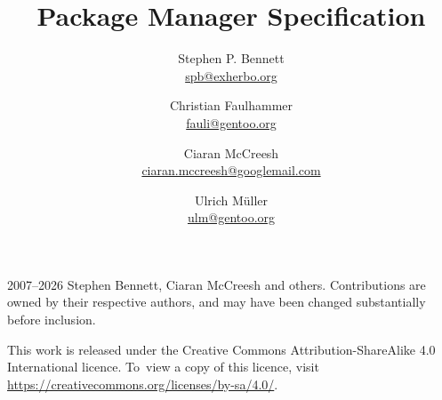 \documentclass{pms}
\title{Package Manager Specification}
\author{%
    Stephen P. Bennett \\
    \href{mailto:spb@exherbo.org}{spb@exherbo.org}
    \and
    Christian Faulhammer \\
    \href{mailto:fauli@gentoo.org}{fauli@gentoo.org}
    \and
    Ciaran McCreesh \\
    \href{mailto:ciaran.mccreesh@googlemail.com}{ciaran.mccreesh@googlemail.com}
    \and
    Ulrich Müller \\
    \href{mailto:ulm@gentoo.org}{ulm@gentoo.org}
}
\begin{document}
\maketitle

\thispagestyle{empty}
\vspace*{\fill}
{%
    \small
    \textcopyright{} 2007--2026 Stephen Bennett, Ciaran McCreesh and others. Contributions are owned
    by their respective authors, and may have been changed substantially before inclusion.

    This work is released under the Creative Commons Attribution-ShareAlike 4.0 International
    licence. To~view a copy of this licence, visit
    \url{https://creativecommons.org/licenses/by-sa/4.0/}.

    \commitinfo
}

\tableofcontents
\listofalgorithms
\listoflistings
\listoftables



















\appendix



\end{document}
